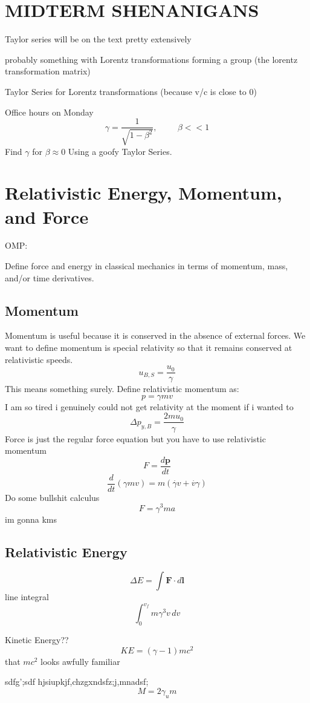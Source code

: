 \documentclass{report}
\begin{document}
\chapter{MIDTERM SHENANIGANS}
Taylor series will be on the text pretty extensively 

probably something with Lorentz transformations forming a group (the lorentz transformation matrix)

Taylor Series for Lorentz transformations (because v/c is close to 0)

Office hours on Monday
\[
\gamma = \frac{1}{\sqrt{ 1 - \beta^2}}, \hspace{1cm} \beta << 1
\]
Find $\gamma$ for $\beta \approx 0$ Using a goofy Taylor Series.



\chapter{Relativistic Energy, Momentum, and Force}
OMP:

Define force and energy in classical mechanics in terms of momentum, mass, and/or time derivatives.

\section{Momentum}
Momentum is useful because it is conserved in the absence of external forces. We want to define momentum is special relativity so that it remains conserved at relativistic speeds.
\[
u_{B,S} = \frac{u_0}{\gamma}
\]
This means something surely. Define relativistic momentum as:
\[
p = \gamma m v
\]
I am so tired i genuinely could not get relativity at the moment if i wanted to
\[
\Delta p_{y,B} = \frac{2mu_0}{\gamma}
\]
Force is just the regular force equation but you have to use relativistic momentum
\[
F = \frac{d\mathbf{p}}{dt}
\]
\[
\frac{d}{dt}(\gamma m v) = m(\overset{\cdot}{\gamma}v + \overset{\cdot}{v}\gamma)
\]
Do some bullshit calculus
\[
F = \gamma^3 ma
\]
im gonna kms

\section{Relativistic Energy}
\[
\Delta E = \int \mathbf{F} \cdot d \mathbf{l}
\]
line integral
\[
\int^{v_f}_0 m \gamma^3 v \, dv
\]

Kinetic Energy??
\[
KE = (\gamma - 1)mc^2
\]
that $mc^2$ looks awfully familiar

sdfg';sdf
hjsiupkjf,chzgxndsfz;j,mnadsf;
\[
M = 2 \gamma_u m
\]
\end{document}
